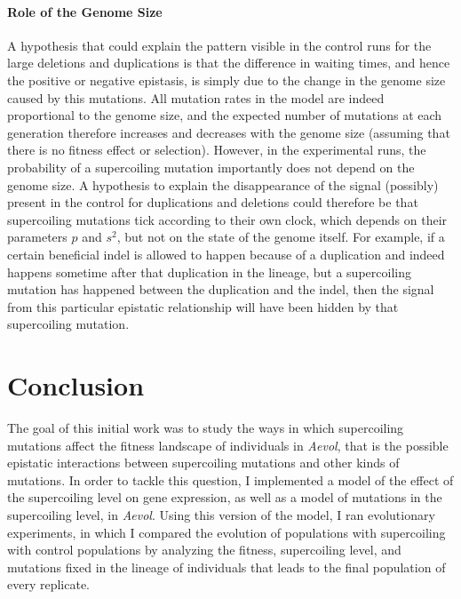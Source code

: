 \paragraph{Role of the Genome Size}
A hypothesis that could explain the pattern visible in the control runs for the large deletions and duplications is that the difference in waiting times, and hence the positive or negative epistasis, is simply due to the change in the genome size caused by this mutations.
All mutation rates in the model are indeed proportional to the genome size, and the expected number of mutations at each generation therefore increases and decreases with the genome size (assuming that there is no fitness effect or selection).
However, in the experimental runs, the probability of a supercoiling mutation importantly does not depend on the genome size.
A hypothesis to explain the disappearance of the signal (possibly) present in the control for duplications and deletions could therefore be that supercoiling mutations tick according to their own clock, which depends on their parameters $p$ and $s^2$, but not on the state of the genome itself.
For example, if a certain beneficial indel is allowed to happen because of a duplication and indeed happens sometime after that duplication in the lineage, but a supercoiling mutation has happened between the duplication and the indel, then the signal from this particular epistatic relationship will have been hidden by that supercoiling mutation.

\section{Conclusion}
\label{sec:aevol:ccl}

The goal of this initial work was to study the ways in which supercoiling mutations affect the fitness landscape of individuals in \emph{Aevol}, that is the possible epistatic interactions between supercoiling mutations and other kinds of mutations.
In order to tackle this question, I implemented a model of the effect of the supercoiling level on gene expression, as well as a model of mutations in the supercoiling level, in \emph{Aevol}.
Using this version of the model, I ran evolutionary experiments, in which I compared the evolution of populations with supercoiling with control populations by analyzing the fitness, supercoiling level, and mutations fixed in the lineage of individuals that leads to the final population of every replicate.

